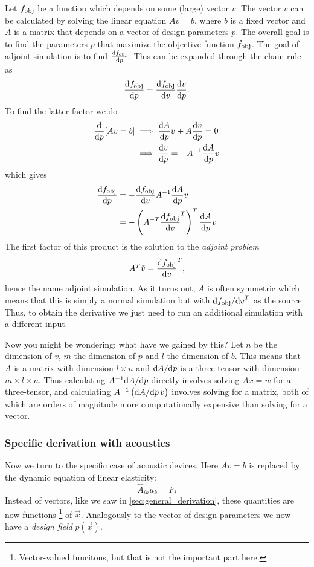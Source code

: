 Let $f_\text{obj}$ be a function which depends on some (large) vector $v$.
The vector $v$ can be calculated by solving the linear equation
$A v = b$, where $b$ is a fixed vector and $A$ is a matrix that depends on a
vector of design parameters $p$.
The overall goal is to find the parameters $p$ that maximize the objective
function $f_\text{obj}$.
The goal of adjoint simulation is to find $\diff{\fobj}{p}$.
This can be expanded through the chain rule as
\[
	\diff{\fobj}{p} = \diff{\fobj}{v} \diff{v}{p}.
\]
To find the latter factor we do
\begin{align*}
	\diff{}{p} [Av = b] &\implies \diff{A}{p} v + A \diff{v}{p} = 0\\
						&\implies \diff{v}{p} = -A^{-1} \diff{A}{p} v
\end{align*}
which gives
\begin{align}
	\diff{\fobj}{p} &= - \diff{\fobj}{v} A^{-1} \diff{A}{p}
	v\label{eq:no_adj_sim}\\
	&= - \left(A^{-T} \diff{\fobj}{v}^T \right)^T \diff{A}{p} v
\end{align}
The first factor of this product is the solution to the \emph{adjoint problem}
\begin{equation}
	A^T \tilde v = \diff{\fobj}{v}^T,
\end{equation}
hence the name adjoint simulation.
As it turns out, $A$ is often symmetric which means that this is simply a normal
simulation but with $\difs{\fobj}{v}^T$ as the source.
Thus, to obtain the derivative we just need to run an additional
simulation with a different input.

Now you might be wondering: what have we gained by this?
Let $n$ be the dimension of $v$, $m$ the dimension of $p$ and $l$ the dimension
of $b$.
This means that $A$ is a matrix with dimension $l\times n$ and $\difs{A}{p}$ is
a three-tensor with dimension $m\times l\times n$.
Thus calculating $A^{-1} \difs{A}{p}$ directly involves solving $Ax = w$ for a
three-tensor, and calculating $A^{-1} \left(\difs{A}{p}\,v\right)$
involves solving for a matrix, both of which are orders of magnitude more
computationally expensive than solving for a vector.

\subsubsection{Specific derivation with acoustics}

Now we turn to the specific case of acoustic devices.
Here $A v = b$ is replaced by the dynamic equation  of linear elasticity:
\begin{equation}\label{eq:sim_eq}
	\hat A_{ik} u_k = F_i
\end{equation}
Instead of vectors, like we saw in \cref{sec:general_derivation}, these quantities are now functions%
\footnote{%
	Vector-valued funcitons, but that is not the important part here.
}
of $\vec x$.
Analogously to the vector of design parameters we now have a \emph{design field}
$p(\vec x)$.

